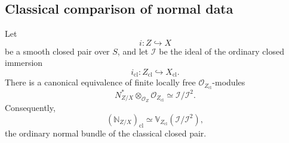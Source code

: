 \subsection{Classical comparison of normal data}

\begin{proposition}
\label{prop:classical-conormal-comparison}
Let
\[
    i
    \colon
    Z
    \hookrightarrow
    X
\]
be a smooth closed pair over \(S\), and let \(\mathcal I\) be the ideal
of the ordinary closed immersion
\[
    i_{\mathrm{cl}}
    \colon
    Z_{\mathrm{cl}}
    \hookrightarrow
    X_{\mathrm{cl}}.
\]
There is a canonical equivalence of finite locally free
\(\mathcal O_{Z_{\mathrm{cl}}}\)-modules
\[
    N^*_{Z/X}
    \otimes_{\mathcal O_Z}
    \mathcal O_{Z_{\mathrm{cl}}}
    \simeq
    \mathcal I/\mathcal I^2.
\]
Consequently,
\[
    (\mathbb N_{Z/X})_{\mathrm{cl}}
    \simeq
    \mathbb V_{Z_{\mathrm{cl}}}
    (\mathcal I/\mathcal I^2),
\]
the ordinary normal bundle of the classical closed pair.
\end{proposition}

